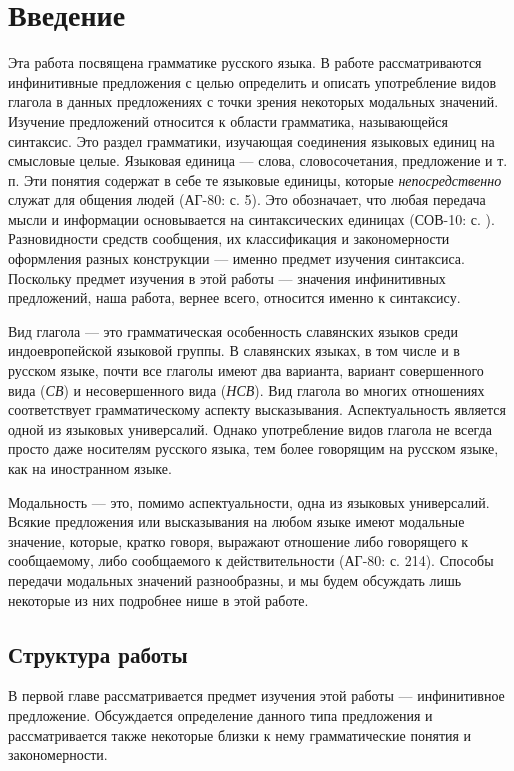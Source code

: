 \section{Введение}

Эта работа  посвящена грамматике русского языка. В работе рассматриваются инфинитивные предложения с целью определить и описать употребление видов глагола в данных предложениях с точки зрения некоторых модальных значений. Изучение предложений относится к области грамматика, называющейся синтаксис. Это раздел грамматики, изучающая соединения языковых единиц на смысловые целые. Языковая единица --- слова, словосочетания, предложение и т. п. Эти понятия содержат в себе те языковые единицы, которые \textit{непосредственно} служат для общения людей (АГ-80: с. 5). Это обозначает, что любая передача мысли и информации основывается на синтаксических единицах (СОВ-10: с. ). Разновидности средств сообщения, их классификация и закономерности оформления разных конструкции --- именно предмет изучения синтаксиса. Поскольку предмет изучения в этой работы --- значения инфинитивных предложений, наша работа, вернее всего, относится именно к синтаксису.

Вид глагола --- это грамматическая особенность славянских языков среди индоевропейской языковой группы. В славянских языках, в том числе и в русском языке, почти все глаголы имеют два варианта, вариант совершенного вида (\textit{СВ}) и несовершенного вида (\textit{НСВ}). Вид глагола во многих отношениях соответствует грамматическому аспекту высказывания. Аспектуальность является одной из языковых универсалий. Однако употребление видов глагола не всегда просто даже носителям русского языка, тем более говорящим на русском языке, как на иностранном языке.

Модальность --- это, помимо аспектуальности, одна из языковых универсалий. Всякие предложения или высказывания на любом языке имеют модальные значение, которые, кратко говоря, выражают отношение либо говорящего к сообщаемому, либо сообщаемого к действительности (АГ-80: с. 214). Способы передачи модальных значений разнообразны, и мы будем обсуждать лишь некоторые из них подробнее нише в этой работе.

\subsection*{Структура работы}

В первой главе рассматривается предмет изучения этой работы --- инфинитивное предложение. Обсуждается определение данного типа предложения и рассматривается также некоторые близки к нему грамматические понятия и закономерности.

